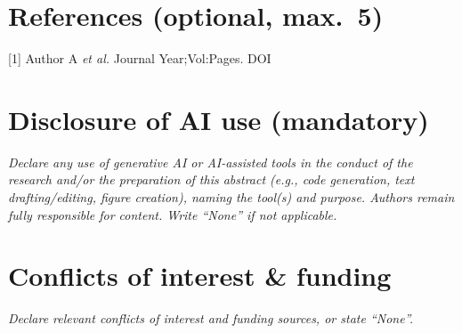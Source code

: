 \documentclass[10pt,a4paper]{article}
\begin{document}
\section{References (optional, max.\ 5)}
{\small [1] Author A \emph{et al.} Journal Year;Vol:Pages. DOI}

\section{Disclosure of AI use (mandatory)}
\textit{Declare any use of generative AI or AI-assisted tools in the conduct
of the research and/or the preparation of this abstract (e.g., code
generation, text drafting/editing, figure creation), naming the tool(s) and
purpose. Authors remain fully responsible for content. Write ``None'' if not
applicable.}

\section{Conflicts of interest \& funding}
\textit{Declare relevant conflicts of interest and funding sources, or state
``None''.}
\end{document}
